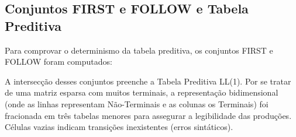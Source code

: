 \documentclass[12pt, a4paper]{article}
\begin{document}
\subsection{Conjuntos FIRST e FOLLOW e Tabela Preditiva}
Para comprovar o determinismo da tabela preditiva, os conjuntos FIRST e FOLLOW foram computados:

\begin{table}[H]
\centering
{}
\caption{Conjuntos FIRST e FOLLOW}
\end{table}

A intersecção desses conjuntos preenche a Tabela Preditiva LL(1). Por se tratar de uma matriz esparsa com muitos terminais, a representação bidimensional (onde as linhas representam Não-Terminais e as colunas os Terminais) foi fracionada em três tabelas menores para assegurar a legibilidade das produções. Células vazias indicam transições inexistentes (erros sintáticos).
\end{document}
